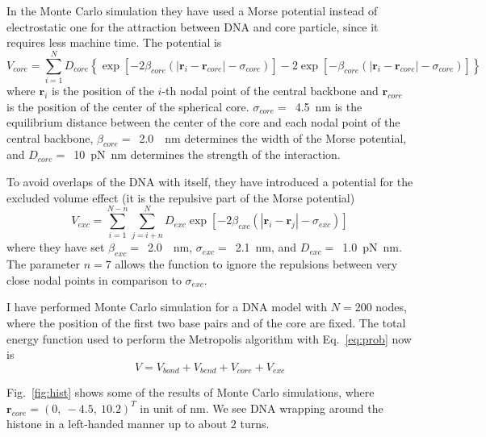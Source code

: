 \documentclass[a4paper,10pt]{article}
\begin{document}
In the Monte Carlo simulation they have used a Morse potential instead of electrostatic one for the attraction between DNA and core particle, since it requires less machine time.
The potential is
\begin{equation}\label{eq:core}
V_{core}=\sum_{i=1}^{N}D_{core}\left\{\exp\left[-2\beta_{core}\left(\left|\textbf{r}_{i}-\textbf{r}_{core}\right|-\sigma_{core}\right)\right]-2\exp\left[-\beta_{core}\left(\left|\textbf{r}_{i}-\textbf{r}_{core}\right|-\sigma_{core}\right)\right]\right\}
\end{equation}
where $\textbf{r}_i$ is the position of the $i$-th nodal point of the central backbone and $\textbf{r}_{core}$ is the position of the center of the spherical core.
$\sigma_{core}=$~\SI{4.5}{\nm} is the equilibrium distance between the center of the core and each nodal point of the central backbone, $\beta_{core}=$~\SI{2.0}{\per\nm} determines the width of the Morse potential, and $D_{core}=$~\SI{10}{\pico\newton\nano\meter} determines the strength of the interaction.

To avoid overlaps of the DNA with itself, they  have introduced a potential for the excluded volume effect (it is the repulsive part of the Morse potential)
\begin{equation}\label{eq:exc}
V_{exc}=\sum_{i=1}^{N-n}\sum_{j=i+n}^{N}D_{exc}\exp\left[-2\beta_{exc}\left(\left|\textbf{r}_{i}-\textbf{r}_{j}\right|-\sigma_{exc}\right)\right]
\end{equation}
where they have set $\beta_{exc}=$~\SI{2.0}{\per\nm}, $\sigma_{exc}=$~\SI{2.1}{\nm}, and $D_{exc}=$~\SI{1.0}{\pico\newton\nano\meter}.
The parameter $n=7$ allows the function to ignore the repulsions between very close nodal points in comparison to $\sigma_{exc}$.

I have performed Monte Carlo simulation for a DNA model with $N=200$ nodes, where the position of the first two base pairs and of the core are fixed.
The total energy function used to perform the Metropolis algorithm with Eq.~\ref{eq:prob} now is
\begin{equation}\label{eq:hist_energy}
V=V_{bond}+V_{bend}+V_{core}+V_{exc}
\end{equation}

Fig.~\ref{fig:hist} shows some of the results of Monte Carlo simulations, where $\textbf{r}_{core}=\left(0,\ -4.5,\ 10.2\right)^T$ in unit of \si{\nm}.
We see DNA wrapping around the histone in a left-handed manner up to about $2$ turns.
\end{document}

